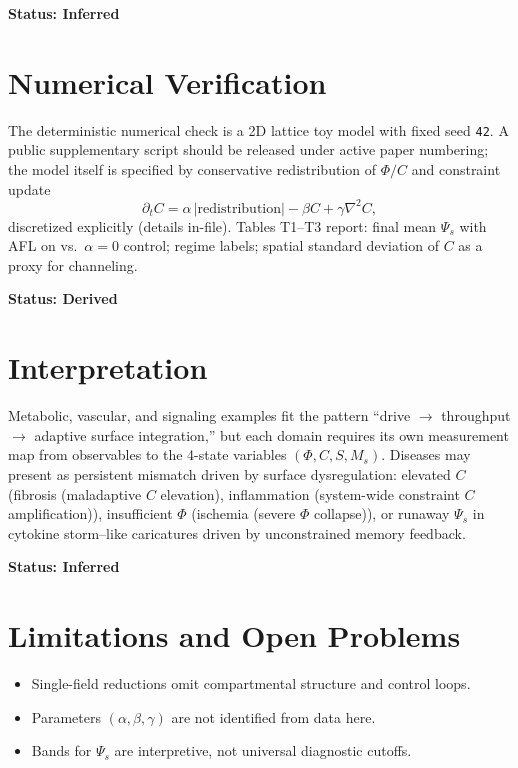 \documentclass[11pt]{article}
\begin{document}
\textbf{Status: Inferred}

\section{Numerical Verification}
The deterministic numerical check is a 2D lattice toy model with fixed seed \texttt{42}. A public supplementary script should be released under active paper numbering; the model itself is specified by conservative redistribution of $\Phi/C$ and constraint update
\begin{equation}
  \partial_t C = \alpha\,|\text{redistribution}| - \beta C + \gamma \nabla^2 C,
\end{equation}
discretized explicitly (details in-file). Tables T1--T3 report: final mean $\Psi_s$ with AFL on vs.\ $\alpha=0$ control; regime labels; spatial standard deviation of $C$ as a proxy for channeling.

\textbf{Status: Derived}

\section{Interpretation}
Metabolic, vascular, and signaling examples fit the pattern ``drive $\rightarrow$ throughput $\rightarrow$ adaptive surface integration,'' but each domain requires its own measurement map from observables to the 4-state variables $(\Phi, C, S, M_s)$. Diseases may present as persistent mismatch driven by surface dysregulation: elevated $C$ (fibrosis (maladaptive $C$ elevation), inflammation (system-wide constraint $C$ amplification)), insufficient $\Phi$ (ischemia (severe $\Phi$ collapse)), or runaway $\Psi_s$ in cytokine storm--like caricatures driven by unconstrained memory feedback.

\textbf{Status: Inferred}

\section{Limitations and Open Problems}
\begin{itemize}
  \item Single-field reductions omit compartmental structure and control loops.
  \item Parameters $(\alpha,\beta,\gamma)$ are not identified from data here.
  \item Bands for $\Psi_s$ are interpretive, not universal diagnostic cutoffs.
\end{itemize}
\end{document}
